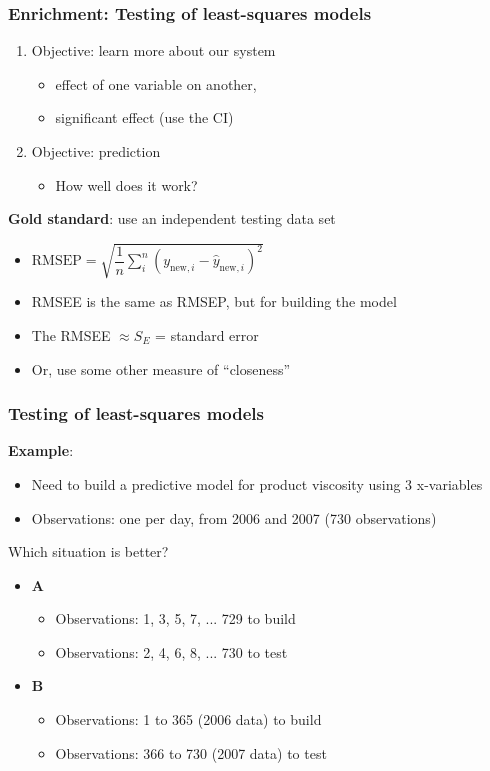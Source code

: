 \begin{frame}\frametitle{Enrichment: Testing of least-squares models}
	\begin{enumerate}
		\item	Objective: learn more about our system 
		\begin{itemize}
			\item	effect of one variable on another, 
			\item	significant effect (use the CI) 
		\end{itemize}
		\item	Objective: prediction 
		\begin{itemize}
			\item	How well does it work? 
		\end{itemize}
	\end{enumerate}
	
	\textbf{Gold standard}: use an independent testing data set 
	\begin{itemize}
		\item	$\text{RMSEP} = \sqrt{\dfrac{1}{n}\sum_{i}^{n}{\left(y_{\text{new}, i} - \hat{y}_{\text{new}, i}\right)^2}}$ 
		\item	RMSEE is the same as RMSEP, but for building the model 
		\item	The RMSEE $\approx S_E$ = standard error 
		\item	Or, use some other measure of ``closeness''
	\end{itemize}
\end{frame}

\begin{frame}\frametitle{Testing of least-squares models}
	
	\textbf{Example}: 
	\begin{itemize}
		\item	Need to build a predictive model for product viscosity using 3 x-variables 
		\item	Observations: one per day, from 2006 and 2007 (730 observations) 
	\end{itemize}
	
	Which situation is better? 
	\begin{itemize}
		\item	\textbf{A} 
		\begin{itemize}
			\item	Observations: 1, 3, 5, 7, ... 729 to build 
			\item	Observations: 2, 4, 6, 8, ... 730 to test 
		\end{itemize}
		\item	\textbf{B} 
		\begin{itemize}
			\item	Observations: 1 to 365 (2006 data) to build 
			\item	Observations: 366 to 730 (2007 data) to test 
		\end{itemize}
	\end{itemize}
\end{frame}

